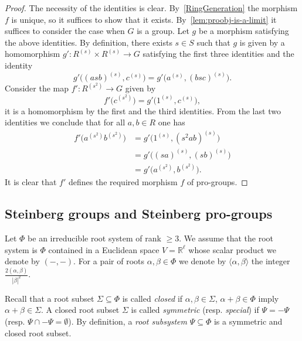 \documentclass[oneside, 11pt]{amsart}
\numberwithin{equation}{section}
\theoremstyle{definition}
\theoremstyle{remark}
\begin{document}
\begin{proof}
The necessity of the identities is clear.
By~\cref{RingGeneration} the morphism \(f\) is unique, so it suffices to show that it exists.
By~\cref{lem:proobj-is-a-limit} it suffices to consider the case when \(G\) is a group. 
Let \(g\) be a morphism satisfying the above identities.
By definition, there exists $s\in S$ such that $g$ is given by a homomorphism \(g' \colon R^{(s)} \times R^{(s)} \to G\) satisfying the first three identities and the identity 
\[g'\bigl((asb)^{(s)}, c^{(s)}\bigr) = g'\bigl(a^{(s)}, (bsc)^{(s)}\bigr).\]
Consider the map \(f' \colon R^{(s^2)} \to G\) given by
\[f'\bigl(c^{(s^2)}\bigr) = g'\bigl(1^{(s)}, c^{(s)}\bigr),\]
it is a homomorphism by the first and the third identities.
From the last two identities we conclude that for all \(a, b \in R\) one has
\begin{align*}
f'\bigl(a^{(s^2)} b^{(s^2)}\bigr)
&= g' \bigl( 1^{(s)}, (s^2 ab)^{(s)} \bigr)\\
&= g' \bigl( (sa)^{(s)}, (sb)^{(s)} \bigr)\\
&= g' \bigl(a^{(s^2)}, b^{(s^2)}\bigr).
\end{align*}
It is clear that \(f'\) defines the required morphism \(f\) of pro-groups.
\end{proof}

\subsection{Steinberg groups and Steinberg pro-groups}
Let $\Phi$ be an irreducible root system of rank $\geq 3$.
We assume that the root system is $\Phi$ contained in a Euclidean space $V = \mathbb{R}^\ell$ whose scalar product we denote by $(-, -)$.
For a pair of roots $\alpha, \beta \in \Phi$ we denote by $\langle \alpha, \beta \rangle$ the integer $\tfrac{2(\alpha, \beta)}{|\beta|^2}$.

Recall that a root subset $\Sigma \subseteq \Phi$ is called {\it closed} if $\alpha, \beta \in \Sigma$, $\alpha+\beta\in\Phi$ imply $\alpha+\beta\in \Sigma$. A closed root subset $\Sigma$ is called {\it symmetric} (resp. {\it special}) if $\Psi = -\Psi$ (resp. $\Psi \cap -\Psi = \emptyset$). By definition, a {\it root subsystem} $\Psi \subseteq \Phi$ is a symmetric and closed root subset.
\end{document}
